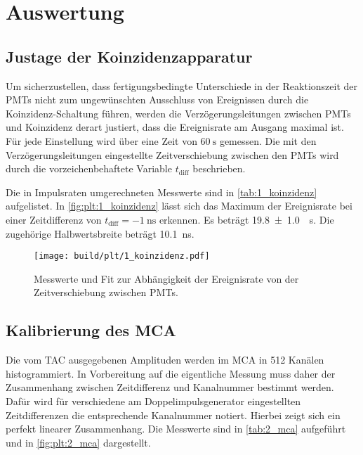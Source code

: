 \section{Auswertung}
\label{sec:auswertung}

\FloatBarrier
\subsection{Justage der Koinzidenzapparatur} \label{sec:auswertung:koinzidenz}
Um sicherzustellen,
dass fertigungsbedingte Unterschiede in der Reaktionszeit der \acp{PMT}
nicht zum ungewünschten Ausschluss von Ereignissen durch die Koinzidenz-Schaltung führen,
werden die Verzögerungsleitungen zwischen \acp{PMT} und Koinzidenz derart justiert,
dass die Ereignisrate am Ausgang maximal ist.
Für jede Einstellung wird über eine Zeit von $\SI{60}{\second}$ gemessen.
%
Die mit den Verzögerungsleitungen eingestellte Zeitverschiebung zwischen den \acp{PMT}
wird durch die vorzeichenbehaftete Variable $t_\text{diff}$ beschrieben.

Die in Impulsraten umgerechneten Messwerte sind in \autoref{tab:1_koinzidenz} aufgelistet.
In \autoref{fig:plt:1_koinzidenz} lässt sich das Maximum der Ereignisrate
bei einer Zeitdifferenz von $t_\text{diff} = \SI{-1}{\nano\second}$ erkennen.
Es beträgt \SI{19.8 \pm 1.0}{\per\second}.
Die zugehörige Halbwertsbreite beträgt \SI{10.1}{\nano\second}.

\begin{table}
    \centering
    \caption{Messwerte zur Abhängigkeit der Ereignisrate von der Zeitverschiebung zwischen \acp{PMT}.}
    \label{tab:1_koinzidenz}
\end{table}

\begin{figure}
    \centering
    \texttt{[image: build/plt/1\_koinzidenz.pdf]}
    \caption{Messwerte und Fit zur Abhängigkeit der Ereignisrate von der Zeitverschiebung zwischen \acp{PMT}.}
    \label{fig:plt:1_koinzidenz}
\end{figure}


\FloatBarrier
\subsection{Kalibrierung des \acs{MCA}} \label{sec:auswertung:mca}
Die vom \ac{TAC} ausgegebenen Amplituden werden im \ac{MCA} in \num{512} Kanälen histogrammiert.
In Vorbereitung auf die eigentliche Messung muss daher
der Zusammenhang zwischen Zeitdifferenz und Kanalnummer bestimmt werden.
Dafür wird für verschiedene am Doppelimpulsgenerator eingestellten Zeitdifferenzen
die entsprechende Kanalnummer notiert.
Hierbei zeigt sich ein perfekt linearer Zusammenhang.
Die Messwerte sind in \autoref{tab:2_mca} aufgeführt und in \autoref{fig:plt:2_mca} dargestellt.

